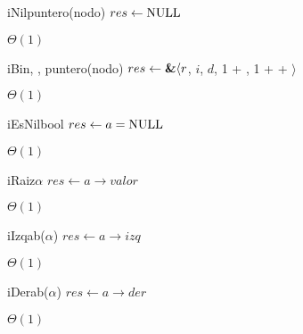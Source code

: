 \begin{Algoritmos}


  \begin{algoritmo}{iNil}{}{puntero(nodo)}
    $res \gets \textrm{NULL}$ 
  \end{algoritmo}
  \datosAlgoritmo{} %
  {} %
  {} %
  {$\Theta(1)$} %
  {} %

  \begin{algoritmo}{iBin}{, , }{puntero(nodo)}
    $res \gets \textbf{\&} \langle r$, $i$, $d$, 1 + , 1 +  +  $\rangle$  
  \end{algoritmo}
  \datosAlgoritmo{} %
  {} %
  {} %
  {$\Theta(1)$} %
  {} %

  \begin{algoritmo}{iEsNil}{}{bool}
    $res \gets a = \textrm{NULL}$ 
  \end{algoritmo}
  \datosAlgoritmo{} %
  {} %
  {} %
  {$\Theta(1)$} %
  {} %

  \begin{algoritmo}{iRaiz}{}{$\alpha$}
    $res \gets a \to valor$ 
  \end{algoritmo}
  \datosAlgoritmo{} %
  {} %
  {} %
  {$\Theta(1)$} %
  {} %

  \begin{algoritmo}{iIzq}{}{ab($\alpha$)}
    $res \gets a \to izq$ 
  \end{algoritmo}
  \datosAlgoritmo{} %
  {} %
  {} %
  {$\Theta(1)$} %
  {} %

  \begin{algoritmo}{iDer}{}{ab($\alpha$)}
    $res \gets a \to der$ 
  \end{algoritmo}
  \datosAlgoritmo{} %
  {} %
  {} %
  {$\Theta(1)$} %
  {} %


\end{Algoritmos}
